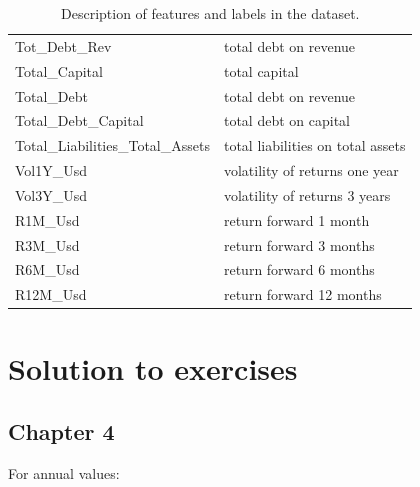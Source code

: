\documentclass[]{krantz}
\theoremstyle{definition}
\theoremstyle{definition}
\theoremstyle{definition}
\theoremstyle{remark}
\begin{document}
\begin{table}
\begin{center}
\begin{tabular}{l l}
Tot\_Debt\_Rev  &   total debt on revenue   \\
Total\_Capital  &   total capital   \\
Total\_Debt &   total debt on revenue   \\
Total\_Debt\_Capital    &   total debt on capital   \\
Total\_Liabilities\_Total\_Assets   &   total liabilities on total assets   \\
Vol1Y\_Usd  &   volatility of returns one year  \\
Vol3Y\_Usd  &   volatility of returns 3 years   \\
R1M\_Usd    &   return forward 1 month  \\
R3M\_Usd    &   return forward 3 months \\
R6M\_Usd    &   return forward 6 months \\
R12M\_Usd   &   return forward 12 months    \\ \hline
\end{tabular}
\end{center}
\caption{Description of features and labels in the dataset. \label{tab:appendix3}}
\end{table}

\hypertarget{solution-to-exercises}{%
\chapter{Solution to exercises}\label{solution-to-exercises}}

\hypertarget{chapter-4}{%
\section{Chapter 4}\label{chapter-4}}

For annual values: \footnotesize
\end{document}
